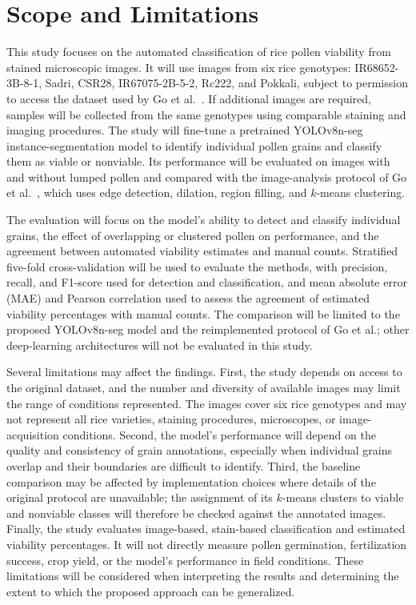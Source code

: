 \newpage
\section{Scope and Limitations}
\label{ch:scope-limitations}

This study focuses on the automated classification of rice pollen viability from stained microscopic images. It will use images from six rice genotypes: IR68652-3B-8-1, Sadri, CSR28, IR67075-2B-5-2, Rc222, and Pokkali, subject to permission to access the dataset used by Go et al.~\cite{go2019}. If additional images are required, samples will be collected from the same genotypes using comparable staining and imaging procedures. The study will fine-tune a pretrained YOLOv8n-seg instance-segmentation model to identify individual pollen grains and classify them as viable or nonviable. Its performance will be evaluated on images with and without lumped pollen and compared with the image-analysis protocol of Go et al.~\cite{go2019}, which uses edge detection, dilation, region filling, and $k$-means clustering.

The evaluation will focus on the model's ability to detect and classify individual grains, the effect of overlapping or clustered pollen on performance, and the agreement between automated viability estimates and manual counts. Stratified five-fold cross-validation will be used to evaluate the methods, with precision, recall, and F1-score used for detection and classification, and mean absolute error (MAE) and Pearson correlation used to assess the agreement of estimated viability percentages with manual counts. The comparison will be limited to the proposed YOLOv8n-seg model and the reimplemented protocol of Go et al.; other deep-learning architectures will not be evaluated in this study.

Several limitations may affect the findings. First, the study depends on access to the original dataset, and the number and diversity of available images may limit the range of conditions represented. The images cover six rice genotypes and may not represent all rice varieties, staining procedures, microscopes, or image-acquisition conditions. Second, the model's performance will depend on the quality and consistency of grain annotations, especially when individual grains overlap and their boundaries are difficult to identify. Third, the baseline comparison may be affected by implementation choices where details of the original protocol are unavailable; the assignment of its $k$-means clusters to viable and nonviable classes will therefore be checked against the annotated images. Finally, the study evaluates image-based, stain-based classification and estimated viability percentages. It will not directly measure pollen germination, fertilization success, crop yield, or the model's performance in field conditions. These limitations will be considered when interpreting the results and determining the extent to which the proposed approach can be generalized.
